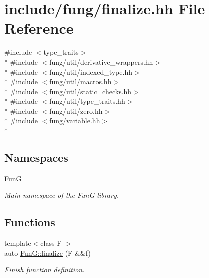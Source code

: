 \hypertarget{finalize_8hh}{\section{include/fung/finalize.hh File Reference}
\label{finalize_8hh}
}
{\ttfamily \#include $<$type\-\_\-traits$>$}\\*
{\ttfamily \#include $<$fung/util/derivative\-\_\-wrappers.\-hh$>$}\\*
{\ttfamily \#include $<$fung/util/indexed\-\_\-type.\-hh$>$}\\*
{\ttfamily \#include $<$fung/util/macros.\-hh$>$}\\*
{\ttfamily \#include $<$fung/util/static\-\_\-checks.\-hh$>$}\\*
{\ttfamily \#include $<$fung/util/type\-\_\-traits.\-hh$>$}\\*
{\ttfamily \#include $<$fung/util/zero.\-hh$>$}\\*
{\ttfamily \#include $<$fung/variable.\-hh$>$}\\*
\subsection*{Namespaces}
\begin{DoxyCompactItemize}
\item 
\hyperlink{namespaceFunG}{Fun\-G}
\begin{DoxyCompactList}\small\item\em Main namespace of the Fun\-G library. \end{DoxyCompactList}\end{DoxyCompactItemize}
\subsection*{Functions}
\begin{DoxyCompactItemize}
\item 
{\footnotesize template$<$class F $>$ }\\auto \hyperlink{namespaceFunG_ac59f2ececc3cd451860776320a4a93d5}{Fun\-G\-::finalize} (F \&\&f)
\begin{DoxyCompactList}\small\item\em Finish function definition. \end{DoxyCompactList}\end{DoxyCompactItemize}
